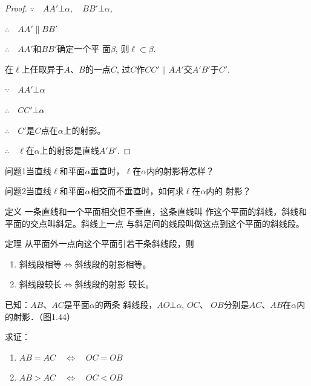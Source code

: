 \begin{proof}
  $\because\quad AA'\bot \alpha,\quad BB'\bot\alpha$,

$\therefore\quad AA'\parallel BB'$

$\therefore\quad AA'$和$BB'$确定一个平
面$\beta$, 则$\ell\subset\beta$.

在$\ell$上任取异于$A$、$B$的一点$C$, 过$C$作$CC'\parallel AA'$交$A'B'$于$C'$.

$\because\quad AA'\bot \alpha$

$\therefore \quad CC'\bot\alpha$

$\therefore\quad  C'$是$C$点在$\alpha$上的射影。

$\therefore\quad \ell$在$\alpha$上的射影是直线$A'B'$.
\end{proof}

\begin{blk}
  {问题1}当直线$\ell$和平面$\alpha$垂直时，$\ell$在$\alpha$内的射影将怎样？
\end{blk}


\begin{blk}
  {问题2}当直线$\ell$和平面$\alpha$相交而不垂直时，如何求$\ell$在$\alpha$内的
射影？
\end{blk}

\begin{blk}
  {定义} 一条直线和一个平面相交但不垂直，这条直线叫
作这个平面的斜线，斜线和平面的交点叫斜足。斜线上一点
与斜足间的线段叫做这点到这个平面的斜线段。
\end{blk}

\begin{blk}
{定理} 从平面外一点向这个平面引若干条斜线段，则
\begin{enumerate}
  \item 斜线段相等$\Longleftrightarrow$斜线段的射影相等。
  \item 斜线段较长$\Longleftrightarrow$斜线段的射影
较长。
\end{enumerate}
\end{blk}


已知：$AB$、$AC$是平面$\alpha$的两条
斜线段，$AO\bot\alpha$, $OC$、
$OB$分别是$AC$、$AB$在$\alpha$内的射影．（图1.44）

求证：
\begin{enumerate}
  \item $AB=AC\quad \Longleftrightarrow \quad OC=OB$
  \item $AB>AC\quad \Longleftrightarrow \quad OC<OB$
\end{enumerate}

\begin{figure}[htp]
  \centering
{}
  \caption{}
\end{figure}


